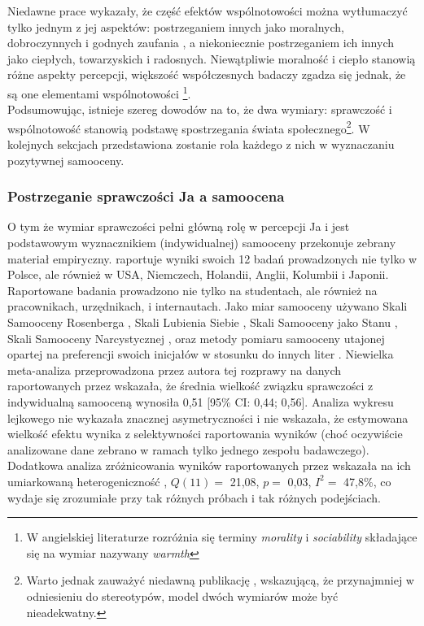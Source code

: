 \documentclass[man]{apa6}
\begin{document}
Niedawne prace wykazały, że część efektów wspólnotowości można wytłumaczyć tylko jednym z jej aspektów: postrzeganiem innych jako moralnych, dobroczynnych i godnych zaufania \parencite[patrz,][]{brambilla2011looking, goodwin2014moral, brambilla2012you, brambilla2014importance}, a niekoniecznie postrzeganiem ich innych jako ciepłych, towarzyskich i radosnych. Niewątpliwie moralność i ciepło stanowią różne aspekty percepcji, większość współczesnych badaczy zgadza się jednak, że są one elementami wspólnotowości \parencite[patrz np.,][]{leach2007group}\footnote{W angielskiej literaturze rozróżnia się terminy \emph{morality} i \emph{sociability} składające się na wymiar nazywany \emph{warmth}}.\\

Podsumowując, istnieje szereg dowodów na to, że dwa wymiary: sprawczość i wspólnotowość stanowią podstawę spostrzegania świata społecznego\footnote{Warto jednak zauważyć niedawną publikację \textcite{koch2016abc}, wskazującą, że przynajmniej w odniesieniu do stereotypów, model dwóch wymiarów może być nieadekwatny.}. W kolejnych sekcjach przedstawiona zostanie rola każdego z nich w wyznaczaniu pozytywnej samooceny.\\

\subsubsection{Postrzeganie sprawczości Ja a samoocena}

O tym że wymiar sprawczości pełni główną rolę w percepcji Ja i jest podstawowym wyznacznikiem (indywidualnej) samooceny przekonuje zebrany materiał empiryczny. \textcite{wojciszke2010sprawczosc} raportuje wyniki swoich 12 badań prowadzonych nie tylko w Polsce, ale również w USA, Niemczech, Holandii, Anglii, Kolumbii i Japonii. Raportowane badania prowadzono nie tylko na studentach, ale również na pracownikach, urzędnikach, i internautach. Jako miar samooceny używano Skali Samooceny Rosenberga \parencite{rosenberg1965society}, Skali Lubienia Siebie \parencite{tafarodi2001two}, Skali Samooceny jako Stanu \parencite{heatherton1991development}, Skali Samooceny Narcystycznej \parencite{raskin1979narcissistic}, oraz metody pomiaru samooceny utajonej opartej na preferencji swoich inicjałów w stosunku do innych liter \parencite{koole20030nature}. Niewielka meta-analiza przeprowadzona przez autora tej rozprawy na danych raportowanych przez \textcite{wojciszke2010sprawczosc} wskazała, że średnia wielkość związku sprawczości z indywidualną samooceną wynosiła 0,51 [95\% CI: 0,44; 0,56]. Analiza wykresu lejkowego nie wykazała znacznej asymetryczności i nie wskazała, że estymowana wielkość efektu wynika z selektywności raportowania wyników (choć oczywiście analizowane dane zebrano w ramach tylko jednego zespołu badawczego). Dodatkowa analiza zróżnicowania wyników raportowanych przez \textcite{wojciszke2010sprawczosc} wskazała na ich umiarkowaną heterogeniczność \parencite[patrz,][]{higgins2003measuring}, $Q(11) = $ 21,08, $p = $ 0,03, $I^2 = $ 47,8\%, co wydaje się zrozumiałe przy tak różnych próbach i tak różnych podejściach.\\
\end{document}
